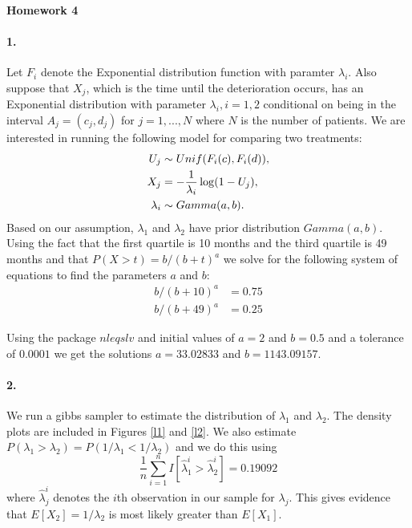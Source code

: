 \documentclass[12pt, leqno]{article}
\begin{document}
\pagestyle{fancy}

\begin{center}
{\large {\bf Homework 4}} \\
\end{center}
\paragraph{1.}
Let $F_i$ denote the Exponential distribution function with paramter
$\lambda_i$. Also suppose that $X_j$, which is the time until the
deterioration occurs, has an Exponential distribution with 
parameter $\lambda_i, i = 1,2$ conditional on
being in the interval $A_j = (c_j,d_j)$ for $j = 1,...,N$ where $N$ is the number of patients. We are interested in running
the following model for comparing two treatments:
\begin{align}
U_j & \sim Unif(F_i(c),F_i(d)), \notag \\
X_j & = - \frac{1}{\lambda_i} \log(1-U_j), \notag \\ 
\lambda_i & \sim Gamma(a,b) \notag .
\end{align}
Based on our assumption, $\lambda_1$ and $\lambda_2$ have prior distribution
$Gamma(a,b)$. Using the fact that the first quartile is 10 months and
the third quartile is 49 months and that $P(X>t) = b/(b+t)^a$ we solve for the following system of
equations to find the parameters $a$ and $b$:
\begin{align}
b/(b+10)^a &= 0.75 \\
b/(b+49)^a &= 0.25 
\end{align}

Using the package $nleqslv$ and initial values of $a = 2$ and $b =
0.5$ and a tolerance of $0.0001$ we get the solutions $a = 33.02833$ 
and $b = 1143.09157$.

\paragraph{2.}
We run a gibbs sampler to estimate the distribution of $\lambda_1$ and
$\lambda_2$. The density plots are included in Figures \ref{l1} and
\ref{l2}. We also estimate ${P(\lambda_1>\lambda_2)} = P(1/\lambda_1<1/\lambda_2)$ and we
do this using 
\[ \frac{1}{n} \sum_{i=1}^n I[\hat{\lambda}_1^i>\hat{\lambda}_2^i] =
0.19092
\]
where $\hat{\lambda}_j^i$ denotes the $i$th observation in our sample
for $\lambda_j$.
This gives evidence that $E[X_2] = 1/ \lambda_2$ is most likely
greater than $E[X_1]$.
\end{document}
